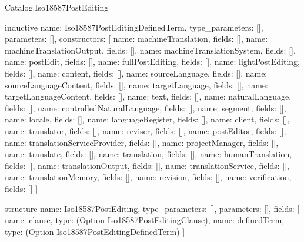 \begin{lexlean}{Catalog.Iso18587PostEditing}
\begin{semanticmodule}
inductive{
  name: Iso18587PostEditingDefinedTerm,
  type_parameters: [],
  parameters: [],
  constructors: [
    {name: machineTranslation, fields: []},
    {name: machineTranslationOutput, fields: []},
    {name: machineTranslationSystem, fields: []},
    {name: postEdit, fields: []},
    {name: fullPostEditing, fields: []},
    {name: lightPostEditing, fields: []},
    {name: content, fields: []},
    {name: sourceLanguage, fields: []},
    {name: sourceLanguageContent, fields: []},
    {name: targetLanguage, fields: []},
    {name: targetLanguageContent, fields: []},
    {name: text, fields: []},
    {name: naturalLanguage, fields: []},
    {name: controlledNaturalLanguage, fields: []},
    {name: segment, fields: []},
    {name: locale, fields: []},
    {name: languageRegister, fields: []},
    {name: client, fields: []},
    {name: translator, fields: []},
    {name: reviser, fields: []},
    {name: postEditor, fields: []},
    {name: translationServiceProvider, fields: []},
    {name: projectManager, fields: []},
    {name: translate, fields: []},
    {name: translation, fields: []},
    {name: humanTranslation, fields: []},
    {name: translationOutput, fields: []},
    {name: translationService, fields: []},
    {name: translationMemory, fields: []},
    {name: revision, fields: []},
    {name: verification, fields: []}
  ]
}

structure{
  name: Iso18587PostEditing,
  type_parameters: [],
  parameters: [],
  fields: [
    {name: clause, type: (Option Iso18587PostEditingClause)},
    {name: definedTerm, type: (Option Iso18587PostEditingDefinedTerm)}
  ]
}
\end{semanticmodule}
\end{lexlean}
